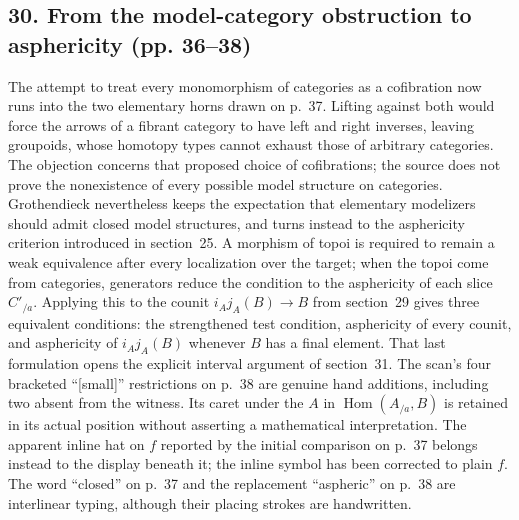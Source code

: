 \subsection*{30. From the model-category obstruction to asphericity (pp. 36--38)}
The attempt to treat every monomorphism of categories as a cofibration now runs into the two elementary horns drawn on p.~37. Lifting against both would force the arrows of a fibrant category to have left and right inverses, leaving groupoids, whose homotopy types cannot exhaust those of arbitrary categories. The objection concerns that proposed choice of cofibrations; the source does not prove the nonexistence of every possible model structure on categories. Grothendieck nevertheless keeps the expectation that elementary modelizers should admit closed model structures, and turns instead to the asphericity criterion introduced in section~25. A morphism of topoi is required to remain a weak equivalence after every localization over the target; when the topoi come from categories, generators reduce the condition to the asphericity of each slice $C'_{/a}$. Applying this to the counit $i_Aj_A(B)\to B$ from section~29 gives three equivalent conditions: the strengthened test condition, asphericity of every counit, and asphericity of $i_Aj_A(B)$ whenever $B$ has a final element. That last formulation opens the explicit interval argument of section~31. The scan's four bracketed ``[small]'' restrictions on p.~38 are genuine hand additions, including two absent from the witness. Its caret under the $A$ in $\operatorname{Hom}(A_{/a},B)$ is retained in its actual position without asserting a mathematical interpretation. The apparent inline hat on $f$ reported by the initial comparison on p.~37 belongs instead to the display beneath it; the inline symbol has been corrected to plain $f$. The word ``closed'' on p.~37 and the replacement ``aspheric'' on p.~38 are interlinear typing, although their placing strokes are handwritten.

